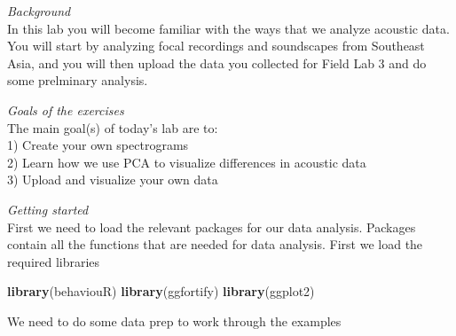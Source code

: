 \documentclass[]{book}
\newenvironment{Shaded}{\begin{snugshade}}{\end{snugshade}}
\newcommand{\KeywordTok}[1]{\textcolor[rgb]{0.13,0.29,0.53}{\textbf{#1}}}
\newcommand{\NormalTok}[1]{#1}
\begin{document}
\emph{Background}\\
In this lab you will become familiar with the ways that we analyze acoustic data. You will start by analyzing focal recordings and soundscapes from Southeast Asia, and you will then upload the data you collected for Field Lab 3 and do some prelminary analysis.

\emph{Goals of the exercises}\\
The main goal(s) of today's lab are to:\\
1) Create your own spectrograms\\
2) Learn how we use PCA to visualize differences in acoustic data\\
3) Upload and visualize your own data

\emph{Getting started}\\
First we need to load the relevant packages for our data analysis. Packages contain all the functions that are needed for data analysis.
First we load the required libraries

\begin{Shaded}
\begin{Highlighting}[]
\KeywordTok{library}\NormalTok{(behaviouR)}
\KeywordTok{library}\NormalTok{(ggfortify) }
\KeywordTok{library}\NormalTok{(ggplot2)}
\end{Highlighting}
\end{Shaded}

We need to do some data prep to work through the examples
\end{document}
